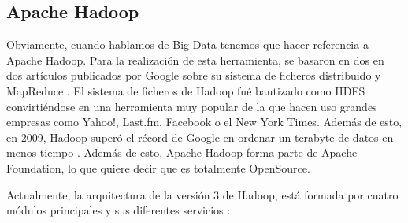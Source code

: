 \subsection{Apache Hadoop\label{Hadoop}}



Obviamente, cuando hablamos de Big Data tenemos que hacer referencia a Apache Hadoop. Para la realización de esta herramienta, se basaron en dos en dos artículos publicados por Google sobre su sistema de ficheros distribuido \cite{Hdp-2} y MapReduce \cite{Hdp-3}. El sistema de ficheros de Hadoop fué bautizado como HDFS convirtiéndose en una herramienta muy popular de la que hacen uso grandes empresas como Yahoo!,   Last.fm, Facebook o el New York Times. Además de esto, en 2009, Hadoop superó el récord de Google en ordenar un terabyte de datos en menos tiempo \cite{Hdp-1}. Además de esto, Apache Hadoop forma parte de Apache Foundation, lo que quiere decir que es totalmente OpenSource.\par

Actualmente, la arquitectura de la versión 3 de Hadoop, está formada por cuatro módulos principales y sus diferentes servicios \cite{Hdp-4}:\par

